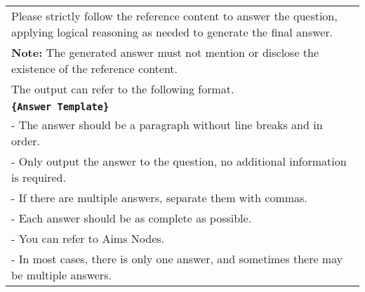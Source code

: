 \begin{table}[htbp]
\begin{tabular}{p{15cm}}
        Please strictly follow the reference content to answer the question, applying logical reasoning as needed to generate the final answer.\\
        
        \textbf{Note:} The generated answer must not mention or disclose the existence of the reference content.\\
        The output can refer to the following format. \\
        \textbf{\texttt{\{Answer Template\}}} \\
        \vspace{2mm}
        - The answer should be a paragraph without line breaks and in order.\\
        
        - Only output the answer to the question, no additional information is required.\\
         
        - If there are multiple answers, separate them with commas.\\
        
        - Each answer should be as complete as possible.\\
        
        - You can refer to Aims Nodes.\\
         
        - In most cases, there is only one answer, and sometimes there may be multiple answers.\\
        
      
        \bottomrule
    \end{tabular}
\end{table}


